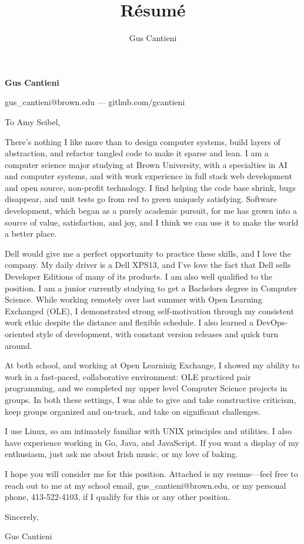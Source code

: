 \documentclass[12pt]{article}
\title{R\'esum\'e}
\author{Gus Cantieni}
\makeatletter
\renewcommand{\maketitle}{
	\begin{center}
		{\huge\bfseries Gus Cantieni}
		\vspace{0.25em}

		gus\_cantieni@brown.edu --- github.com/gcantieni

		\vspace{0.75em}
	\end{center}
}
\makeatother
\begin{document}
\maketitle

\vspace{1em}
\fontsize{12}{15}\selectfont
\noindent
To Amy Seibel, 
\vspace{1em}

\noindent
There's nothing I like more than to design computer systems, build layers of abstraction, and refactor tangled code to make it sparse and lean. I am a computer science major studying at Brown University, with a specialties in AI and computer systems, and with work experience in full stack web development and open source, non-profit technology. I find helping the code base shrink, bugs disappear, and unit tests go from red to green uniquely satisfying. Software development, which began as a purely academic pursuit, for me has grown into a source of value, satisfaction, and joy, and I think we can use it to make the world a better place.
\vspace{0.75em}

\noindent
Dell would give me a perfect opportunity to practice these skills, and I love the company. My daily driver is a Dell XPS13, and I've love the fact that Dell sells Developer Editions of many of its products. I am also well qualified to the position. I am a junior currently studying to get a Bachelors degree in Computer Science. While working remotely over last summer with Open Learning Exchanged (OLE), I demonstrated strong self-motivation through my consistent work ethic despite the distance and flexible schedule. I also learned a DevOps-oriented style of development, with constant version releases and quick turn around. 

\vspace{0.75em}
\noindent
At both school, and working at Open Learninig Exchange, I showed my ability to work in a fast-paced, collaborative environment: OLE practiced pair programming, and we completed my upper level Computer Science projects in groups. In both these settings, I was able to give and take constructive criticism, keep groups organized and on-track, and take on significant challenges. 

\vspace{0.75em}
\noindent
I use Linux, so am intimately familiar with UNIX principles and utilities. I also have experience working in Go, Java, and JavaScript. If you want a display of my enthusiasm, just ask me about Irish music, or my love of baking.  

\vspace{0.75em}
\noindent
I hope you will consider me for this position. Attached is my resume---feel free to reach out to me at my school email, gus\_cantieni@brown.edu, or my personal phone, 413-522-4103, if I qualify for this or any other position.


\vspace{2em}
\hfill Sincerely,

\hfill Gus Cantieni
\end{document}
